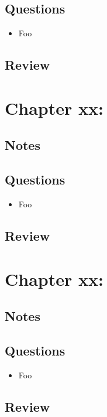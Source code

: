 \subsection{Questions}
\begin{itemize}
  \item Foo
\end{itemize}

\subsection{Review}

\section{Chapter xx: }
\subsection{Notes}

\subsection{Questions}
\begin{itemize}
  \item Foo
\end{itemize}

\subsection{Review}

\section{Chapter xx: }
\subsection{Notes}

\subsection{Questions}
\begin{itemize}
  \item Foo
\end{itemize}

\subsection{Review}
